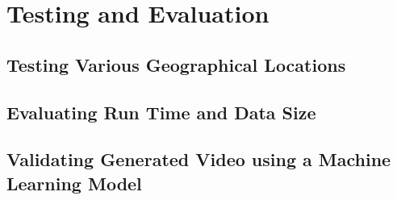 \chapter{Testing and Evaluation}
\label{chapter:testing-and-evaluation}



\section{Testing Various Geographical Locations}



\section{Evaluating Run Time and Data Size}



\section{Validating Generated Video using a Machine Learning Model}
